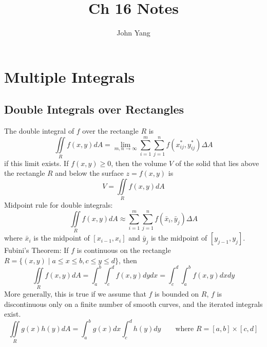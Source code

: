 \documentclass{article}
\title{Ch 16 Notes} %
\author{John Yang}
\begin{document}
    \maketitle
    \tableofcontents
    \section{Multiple Integrals} %
    \subsection{Double Integrals over Rectangles} %
    \begin{outline}
        \1 The double integral of $f$ over the rectangle $R$ is \[\iint\limits_Rf(x,y)dA=\lim_{m,n\to\infty}\sum^m_{i=1}\sum^n_{j=1}f(x_{ij}^*,y_{ij}^*)\Delta A\] if this limit exists. 
        \1 If \(f(x,y)\geq 0\), then the volume $V$ of the solid that lies above the rectangle $R$ and below the surface \(z=f(x,y)\) is \[V=\iint\limits_Rf(x,y)dA\]
        \1 Midpoint rule for double integrals: \[\iint\limits_Rf(x,y)dA\approx\sum^m_{i=1}\sum^n_{j=1}f(\bar x_i,\bar y_j)\Delta A\] where \(\bar x_i\) is the midpoint of \([x_{i-1},x_i]\) and \(\bar y_j\) is the midpoint of \([y_{j-1},y_j]\). 
        \1 Fubini's Theorem: If $f$ is continuous on the rectangle \(R=\{(x,y)\;|\;a\leq x\leq b,c\leq y\leq d\}\), then \[\iint\limits_Rf(x,y)dA=\int^b_a\int^d_cf(x,y)dydx=\int^d_c\int^b_af(x,y)dxdy\] More generally, this is true if we assume that $f$ is bounded on $R$, $f$ is discontinuous only on a finite number of smooth curves, and the iterated integrals exist. 
        \1 \[\iint\limits_Rg(x)h(y)dA=\int^b_ag(x)dx\int^d_ch(y)dy\qquad\text{where }R=[a,b]\times[c,d]\]

    \end{outline}
\end{document}

